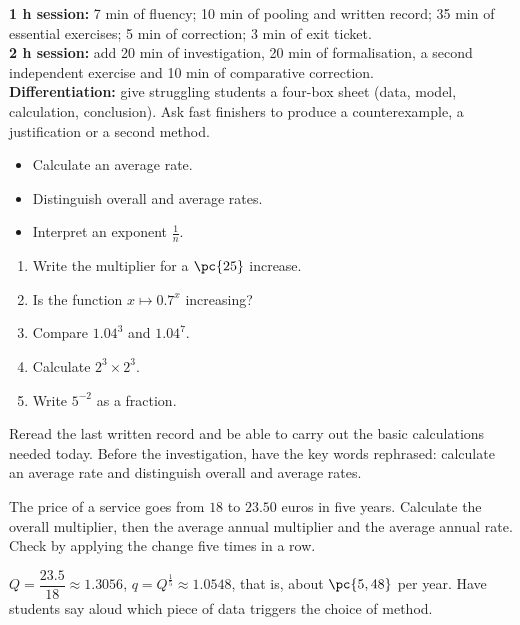 \ifmxteacher
\begin{method}
\textbf{1 h session:} 7 min of fluency; 10 min of pooling and written record; 35 min of essential exercises; 5 min of correction; 3 min of exit ticket.\\
\textbf{2 h session:} add 20 min of investigation, 20 min of formalisation, a second independent exercise and 10 min of comparative correction.\\
\textbf{Differentiation:} give struggling students a four-box sheet (data, model, calculation, conclusion). Ask fast finishers to produce a counterexample, a justification or a second method.
\end{method}
\fi
{}
\begin{objectives}\begin{itemize}\item Calculate an average rate.\item Distinguish overall and average rates.\item Interpret an exponent $\frac1n$.\end{itemize}\end{objectives}
\begin{fluency}\begin{enumerate}\item Write the multiplier for a $\pc{25}$ increase. \item Is the function $x\mapsto\num{0,7}^x$ increasing? \item Compare $\num{1,04}^3$ and $\num{1,04}^7$. \item Calculate $2^3\times2^3$. \item Write $5^{-2}$ as a fraction. \end{enumerate}\end{fluency}
\begin{prerequisites}Reread the last written record and be able to carry out the basic calculations needed today. Before the investigation, have the key words rephrased: calculate an average rate and distinguish overall and average rates.\end{prerequisites}

\begin{activity}
The price of a service goes from $18$ to $\num{23,50}$ euros in five years. Calculate the overall multiplier, then the average annual multiplier and the average annual rate. Check by applying the change five times in a row.

\end{activity}
\begin{solution}$Q=\dfrac{\num{23,5}}{18}\approx\num{1,3056}$, $q=Q^{\frac15}\approx\num{1,0548}$, that is, about $\pc{5,48}$ per year. Have students say aloud which piece of data triggers the choice of method.\end{solution}

